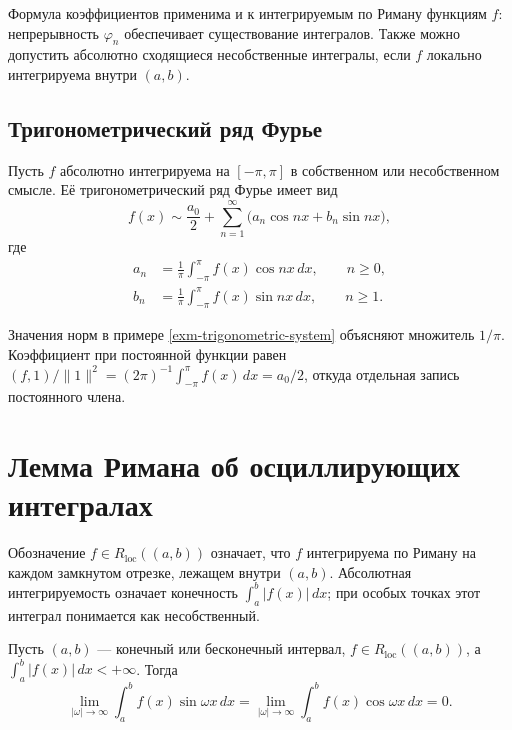 Формула коэффициентов применима и к интегрируемым по Риману функциям \(f\): непрерывность \(\varphi_n\) обеспечивает существование интегралов. Также можно допустить абсолютно сходящиеся несобственные интегралы, если \(f\) локально интегрируема внутри \((a,b)\).

\subsection{Тригонометрический ряд Фурье}\label{sec-fourier-trigonometric}

\begin{definition}\label{def-trigonometric-fourier-series}

Пусть \(f\) абсолютно интегрируема на \([-\pi,\pi]\) в собственном или несобственном смысле. Её тригонометрический ряд Фурье имеет вид
\begin{equation}
f(x)\sim\frac{a_0}{2}+\sum_{n=1}^\infty\bigl(a_n\cos nx+b_n\sin nx\bigr),
\label{eq-trigonometric-fourier-series}
\end{equation}
где
\begin{equation}
\begin{aligned}
a_n&=\frac1\pi\int_{-\pi}^{\pi}f(x)\cos nx\,dx,\qquad n\ge0,\\
b_n&=\frac1\pi\int_{-\pi}^{\pi}f(x)\sin nx\,dx,\qquad n\ge1.
\end{aligned}
\label{eq-trigonometric-coefficients}
\end{equation}

\end{definition}

Значения норм в примере \ref{exm-trigonometric-system} объясняют множитель \(1/\pi\). Коэффициент при постоянной функции равен \((f,1)/\|1\|^2=(2\pi)^{-1}\int_{-\pi}^{\pi}f(x)\,dx=a_0/2\), откуда отдельная запись постоянного члена.

\section{Лемма Римана об осциллирующих интегралах}\label{sec-fourier-riemann}

Обозначение \(f\in R_{\mathrm{loc}}((a,b))\) означает, что \(f\) интегрируема по Риману на каждом замкнутом отрезке, лежащем внутри \((a,b)\). Абсолютная интегрируемость означает конечность \(\int_a^b|f(x)|\,dx\); при особых точках этот интеграл понимается как несобственный.

\begin{lemma}[Римана]\label{lem-riemann-oscillatory}

Пусть \((a,b)\) --- конечный или бесконечный интервал, \(f\in R_{\mathrm{loc}}((a,b))\), а \(\int_a^b|f(x)|\,dx<+\infty\). Тогда
\begin{equation}
\lim_{|\omega|\to\infty}\int_a^b f(x)\sin\omega x\,dx
=\lim_{|\omega|\to\infty}\int_a^b f(x)\cos\omega x\,dx=0.
\label{eq-riemann-oscillatory}
\end{equation}

\end{lemma}

